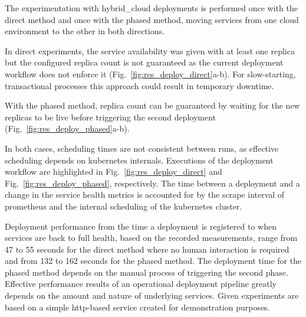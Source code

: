 \documentclass[../main.tex]{subfiles}
\begin{document}
    The experimentation with \gls{hybrid_cloud} deployments is performed once with the direct method and once with the phased method, moving services from one \gls{cloud} environment to the other in both directions.

    In direct experiments, the service availability was given with at least one replica but the configured replica count is not guaranteed as the current deployment workflow does not enforce it (Fig.~\ref{fig:res_deploy_direct}a-b).
    For slow-starting, transactional processes this approach could result in temporary downtime.

    

    With the phased method, replica count can be guaranteed by waiting for the new replicas to be live before triggering the second deployment (Fig.~\ref{fig:res_deploy_phased}a-b).

    

    In both cases, scheduling times are not consistent between runs, as effective scheduling depends on \gls{kubernetes} internals.
    Executions of the deployment workflow are highlighted in Fig.~\ref{fig:res_deploy_direct} and Fig.~\ref{fig:res_deploy_phased}, respectively.
    The time between a deployment and a change in the service health metrics is accounted for by the scrape interval of \gls{prometheus} and the internal scheduling of the \gls{kubernetes} cluster.

    Deployment performance from the time a deployment is registered to when services are back to full health, based on the recorded measurements, range from 47 to 55 seconds for the direct method where no human interaction is required and from 132 to 162 seconds for the phased method.
    The deployment time for the phased method depends on the manual process of triggering the second phase.
    Effective performance results of an operational deployment pipeline greatly depends on the amount and nature of underlying services.
    Given experiments are based on a simple \acrshort{http}-based service created for demonstration purposes.
\end{document}
